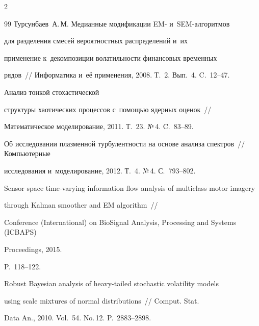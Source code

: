 \begin{multicols}{2}
{{\begin{thebibliography}{99}
{Турсунбаев~А.\,М.} Медианные  модификации EM- и~SEM-ал\-го\-рит\-мов

для разделения смесей вероятностных распределений и~их

применение к~декомпозиции волатильности финансовых временных

рядов~// Информатика и~её применения, 2008. Т.~2. Вып.~4. C.~12--47.




 Анализ тонкой стохастической

структуры хаотических процессов с~по\-мощью ядерных оценок~//

Математическое моделирование, 2011. Т.~23. №\,4. C.~83--89.





Об исследовании плазменной турбулентности на основе анализа спектров~// Компьютерные

исследования и~моделирование, 2012. Т.~4. №\,4. С.~793--802.





Sensor space time-varying information flow analysis of multiclass motor imagery 

through Kalman smoother and EM algorithm~// 

Conference (International) on BioSignal Analysis, Processing and Systems (ICBAPS)

Proceedings, 2015. 

P.~118--122.





Robust Bayesian analysis of heavy-tailed stochastic volatility models 

using scale mixtures of normal distributions~// Comput. Stat. 

Data An., 2010. Vol.~54. No.\,12. P.~2883--2898.





\end{thebibliography}}}
\end{multicols}
